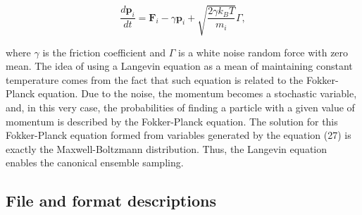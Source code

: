 \documentclass[a4paper,11pt]{article}
\begin{document}
\begin{equation}
 \frac{d\textbf{p}_{i}}{dt} = \textbf{F}_{i} - \gamma\textbf{p}_{i} + \sqrt{\frac{2\gamma k_{B}T}{m_{i}}}\Gamma,
\end{equation}

where $\gamma$ is the friction coefficient and $\Gamma$ is a white noise
random force with zero mean. The idea of using a Langevin equation as a
mean of maintaining constant temperature comes from the fact that such
equation is related to the Fokker-Planck equation. Due to the noise, the
momentum becomes a stochastic variable, and, in this very case, the
probabilities of finding a particle with a given value of momentum is
described by the Fokker-Planck equation. The solution for this
Fokker-Planck equation formed from variables generated by the equation
(27) is exactly the Maxwell-Boltzmann distribution. Thus, the Langevin
equation enables the canonical ensemble sampling.

\subsection{File and format descriptions}
\end{document}
